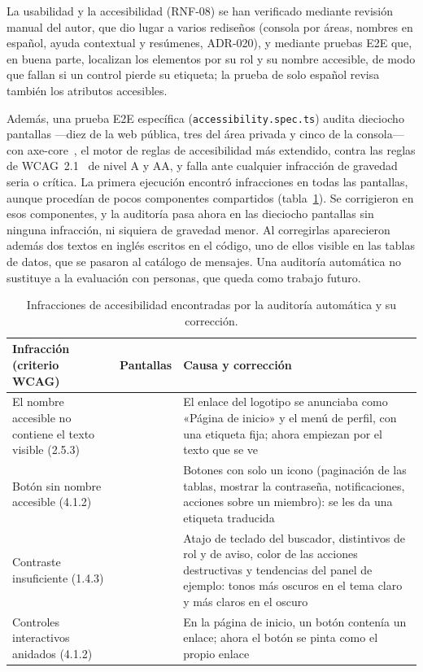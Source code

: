 La usabilidad y la accesibilidad (RNF-08) se han verificado mediante revisión
manual del autor, que dio lugar a varios rediseños (consola por áreas,
nombres en español, ayuda contextual y resúmenes, ADR-020), y mediante
pruebas E2E que, en buena parte, localizan los elementos por su rol y su
nombre accesible, de modo que fallan si un control pierde su etiqueta; la
prueba de solo español revisa también los atributos accesibles.

Además, una prueba E2E específica (\texttt{accessibility.spec.ts}) audita
dieciocho pantallas ---diez de la web pública, tres del área privada y cinco de
la consola--- con axe-core~\cite{axe-core}, el motor de reglas de
accesibilidad más extendido, contra las reglas de WCAG~2.1~\cite{wcag21} de
nivel A y AA, y falla ante cualquier infracción de gravedad seria o crítica.
La primera ejecución encontró infracciones en todas las pantallas, aunque
procedían de pocos componentes compartidos (tabla~\ref{tab:pru-accesibilidad}).
Se corrigieron en esos componentes, y la auditoría pasa ahora en las
dieciocho pantallas sin ninguna infracción, ni siquiera de gravedad menor. Al
corregirlas aparecieron además dos textos en inglés escritos en el código,
uno de ellos visible en las tablas de datos, que se pasaron al catálogo de
mensajes. Una auditoría automática no sustituye a la evaluación con personas,
que queda como trabajo futuro.

\begin{table}[htbp]
  \centering
  \footnotesize
  \caption{Infracciones de accesibilidad encontradas por la auditoría automática y su corrección.}
  \label{tab:pru-accesibilidad}
  \begin{tabularx}{\textwidth}{@{}>{\raggedright\arraybackslash}p{3.4cm}>{\raggedright\arraybackslash}p{1.6cm}X@{}}
    \toprule
    \textbf{Infracción (criterio WCAG)} & \textbf{Pantallas} & \textbf{Causa y corrección} \\
    \midrule
    El nombre accesible no contiene el texto visible (2.5.3) & 15 & El enlace del logotipo se anunciaba como «Página de inicio» y el menú de perfil, con una etiqueta fija; ahora empiezan por el texto que se ve \\
    Botón sin nombre accesible (4.1.2) & 6 & Botones con solo un icono (paginación de las tablas, mostrar la contraseña, notificaciones, acciones sobre un miembro): se les da una etiqueta traducida \\
    Contraste insuficiente (1.4.3) & 8 & Atajo de teclado del buscador, distintivos de rol y de aviso, color de las acciones destructivas y tendencias del panel de ejemplo: tonos más oscuros en el tema claro y más claros en el oscuro \\
    Controles interactivos anidados (4.1.2) & 1 & En la página de inicio, un botón contenía un enlace; ahora el botón se pinta como el propio enlace \\
    \bottomrule
  \end{tabularx}
\end{table}

